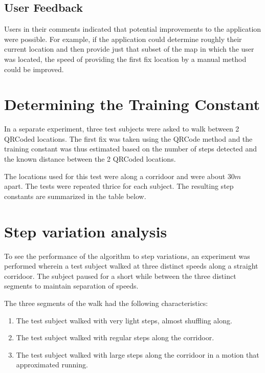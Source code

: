 
\subsection{User Feedback}

Users in their comments indicated that potential improvements to the 
application were possible. For example, if the application could determine 
roughly their current location and then provide just that subset of the map
in which the user was located, the speed of providing the first fix location 
by a manual method could be improved.

\section{Determining the Training Constant}

In a separate experiment, three test subjects were asked to walk between 
2 QRCoded locations. The first fix was taken using the QRCode method and 
the training constant was thus estimated based on the number of steps 
detected and the known distance between the 2 QRCoded locations.

The locations used for this test were along a corridoor and were about $30 m$
apart. The tests were repeated thrice for each subject. The resulting 
step constants are summarized in the table below.


\section{Step variation analysis}

To see the performance of the algorithm to step variations, an experiment 
was performed wherein a test subject walked at three distinct speeds
along a straight corridoor. The subject paused for a short while between 
the three distinct segments to maintain separation of speeds.

The three segments of the walk had the following
characteristics:

\begin{enumerate}
\item The test subject walked with very light steps, almost shuffling along. 
\item The test subject walked with regular steps along the corridoor.
\item The test subject walked with large steps along the corridoor in a motion
    that approximated running.
\end{enumerate}

